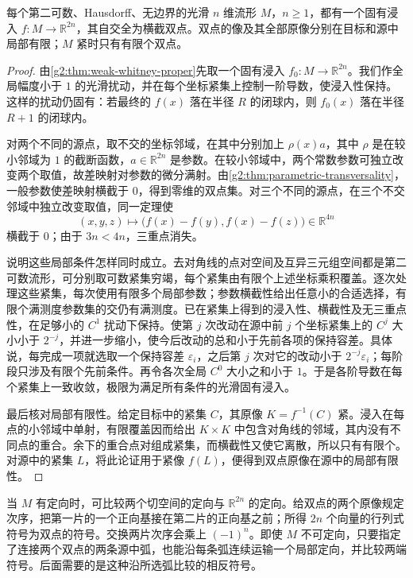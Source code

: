 \begin{lemma}\label{g2:lem:proper-self-transverse-immersion}
	每个第二可数、Hausdorff、无边界的光滑 \(n\) 维流形 \(M\)，\(n\ge1\)，都有一个固有浸入 \(f:M\to\mathbb R^{2n}\)，其自交全为横截双点。双点的像及其全部原像分别在目标和源中局部有限；\(M\) 紧时只有有限个双点。
\end{lemma}
\begin{proof}
	由\cref{g2:thm:weak-whitney-proper}先取一个固有浸入 \(f_0:M\to\mathbb R^{2n}\)。我们作全局幅度小于 \(1\) 的光滑扰动，并在每个坐标紧集上控制一阶导数，使浸入性保持。这样的扰动仍固有：若最终的 \(f(x)\) 落在半径 \(R\) 的闭球内，则 \(f_0(x)\) 落在半径 \(R+1\) 的闭球内。

	对两个不同的源点，取不交的坐标邻域，在其中分别加上 \(\rho(x)a\)，其中 \(\rho\) 是在较小邻域为 \(1\) 的截断函数，\(a\in\mathbb R^{2n}\) 是参数。在较小邻域中，两个常数参数可独立改变两个取值，故差映射对参数的微分满射。由\cref{g2:thm:parametric-transversality}，一般参数使差映射横截于 \(0\)，得到零维的双点集。对三个不同的源点，在三个不交邻域中独立改变取值，同一定理使
	\[
		(x,y,z)\longmapsto\bigl(f(x)-f(y),f(x)-f(z)\bigr)\in\mathbb R^{4n}
	\]
	横截于 \(0\)；由于 \(3n<4n\)，三重点消失。

	说明这些局部条件怎样同时成立。去对角线的点对空间及互异三元组空间都是第二可数流形，可分别取可数紧集穷竭，每个紧集由有限个上述坐标乘积覆盖。逐次处理这些紧集，每次使用有限多个局部参数；参数横截性给出任意小的合适选择，有限个满测度参数集的交仍有满测度。已在紧集上得到的浸入性、横截性及无三重点性，在足够小的 \(C^1\) 扰动下保持。使第 \(j\) 次改动在源中前 \(j\) 个坐标紧集上的 \(C^j\) 大小小于 \(2^{-j}\)，并进一步缩小，使今后改动的总和小于先前各项的保持容差。具体说，每完成一项就选取一个保持容差 \(\varepsilon_i\)，之后第 \(j\) 次对它的改动小于 \(2^{-j}\varepsilon_i\)；每阶段只涉及有限个先前条件。再令各次全局 \(C^0\) 大小之和小于 \(1\)。于是各阶导数在每个紧集上一致收敛，极限为满足所有条件的光滑固有浸入。

	最后核对局部有限性。给定目标中的紧集 \(C\)，其原像 \(K=f^{-1}(C)\) 紧。浸入在每点的小邻域中单射，有限覆盖因而给出 \(K\times K\) 中包含对角线的邻域，其内没有不同点的重合。余下的重合点对组成紧集，而横截性又使它离散，所以只有有限个。对源中的紧集 \(L\)，将此论证用于紧像 \(f(L)\)，便得到双点原像在源中的局部有限性。
\end{proof}

当 \(M\) 有定向时，可比较两个切空间的定向与 \(\mathbb R^{2n}\) 的定向。给双点的两个原像规定次序，把第一片的一个正向基接在第二片的正向基之前；所得 \(2n\) 个向量的行列式符号为双点的符号。交换两片次序会乘上 \((-1)^n\)。即使 \(M\) 不可定向，只要指定了连接两个双点的两条源中弧，也能沿每条弧连续运输一个局部定向，并比较两端符号。后面需要的是这种沿所选弧比较的相反符号。

